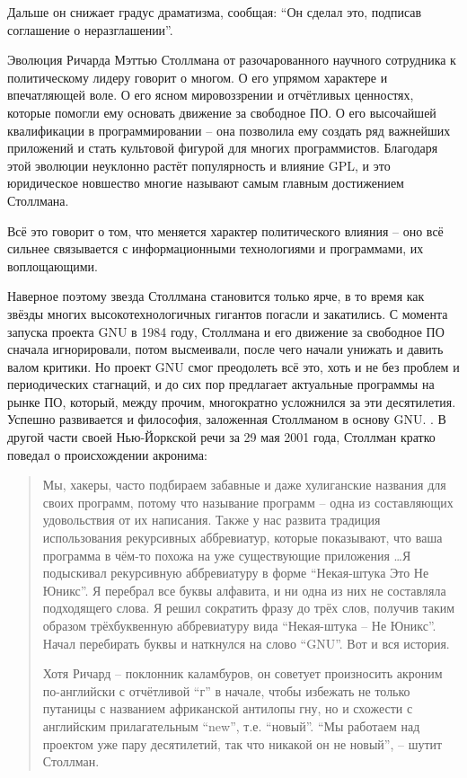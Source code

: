 Дальше он снижает градус драматизма, сообщая:  \enquote{Он сделал это, подписав соглашение о неразглашении}.

Эволюция Ричарда Мэттью Столлмана от разочарованного научного сотрудника к политическому лидеру говорит о многом. О его упрямом характере и впечатляющей воле. О его ясном мировоззрении и отчётливых ценностях, которые помогли ему основать движение за свободное ПО. О его высочайшей квалификации в программировании -- она позволила ему создать ряд важнейших приложений и стать культовой фигурой для многих программистов. Благодаря этой эволюции неуклонно растёт популярность и влияние GPL, и это юридическое новшество многие называют самым главным достижением Столлмана.

Всё это говорит о том, что меняется характер политического влияния -- оно всё сильнее связывается с информационными технологиями и программами, их воплощающими. 

Наверное поэтому звезда Столлмана становится только ярче, в то время как звёзды многих высокотехнологичных гигантов погасли и закатились. С момента запуска проекта GNU в 1984 году, Столлмана и его движение за свободное ПО сначала игнорировали, потом высмеивали, после чего начали унижать и давить валом критики. Но проект GNU смог преодолеть всё это, хоть и не без проблем и периодических стагнаций, и до сих пор предлагает актуальные программы на рынке ПО, который, между прочим, многократно усложнился за эти десятилетия. Успешно развивается и философия, заложенная Столлманом в основу GNU. . В другой части своей Нью-Йоркской речи за 29 мая 2001 года, Столлман кратко поведал о происхождении акронима:

\begin{quote}
Мы, хакеры, часто подбираем забавные и даже хулиганские названия для своих программ, потому что называние программ -- одна из составляющих удовольствия от их написания. Также у нас развита традиция использования рекурсивных аббревиатур, которые показывают, что ваша программа в чём-то похожа на уже существующие приложения \ldots Я подыскивал рекурсивную аббревиатуру в форме \enquote{Некая-штука Это Не Юникс}. Я перебрал все буквы алфавита, и ни одна из них не составляла подходящего слова. Я решил сократить фразу до трёх слов, получив таким образом трёхбуквенную аббревиатуру вида \enquote{Некая-штука -- Не Юникс}. Начал перебирать буквы и наткнулся на слово \enquote{GNU}. Вот и вся история.

Хотя Ричард -- поклонник каламбуров, он советует произносить акроним по-английски с отчётливой \enquote{г} в начале, чтобы избежать не только путаницы с названием африканской антилопы гну, но и схожести с английским прилагательным \enquote{new}, т.е. \enquote{новый}. \enquote{Мы работаем над проектом уже пару десятилетий, так что никакой он не новый}, -- шутит Столлман.
\end{quote}

